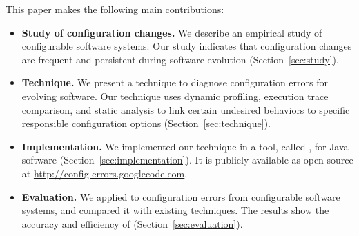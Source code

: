 This paper makes the following main contributions:

\begin{itemize}
\vspace{-3mm}
\item \textbf{Study of configuration changes.} We describe an empirical
study of \studysubjnum configurable software systems.
Our study indicates that configuration changes
are frequent and persistent during software evolution (Section~\ref{sec:study}).

\item \textbf{Technique.} We present a technique to diagnose
configuration errors for evolving software. Our technique
uses dynamic profiling, execution trace comparison, and
static analysis to link certain undesired behaviors to
specific responsible configuration options (Section~\ref{sec:technique}).

\item \textbf{Implementation.} We implemented our technique
in a tool, called \ourtool, for Java software (Section~\ref{sec:implementation}).
It is publicly available as open source at \url{http://config-errors.googlecode.com}.

\item \textbf{Evaluation.} We applied \ourtool to \errornum configuration
errors from \subjnum configurable software systems,
and compared it with existing techniques.
The results show the accuracy and efficiency of \ourtool (Section~\ref{sec:evaluation}).
\end{itemize}

